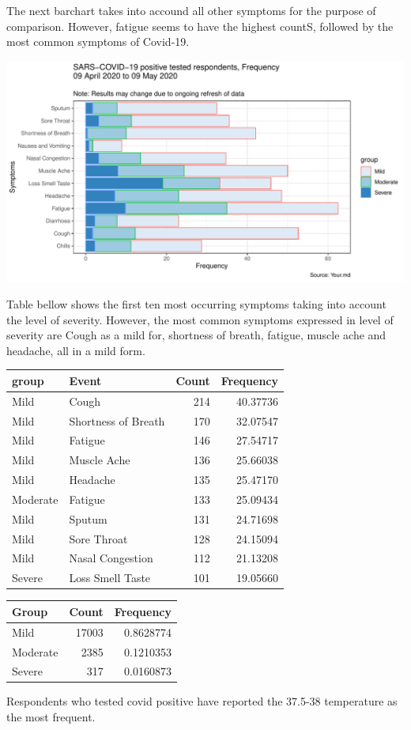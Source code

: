 \documentclass[
]{article}
\begin{document}
The next barchart takes into accound all other symptoms for the purpose
of comparison. However, fatigue seems to have the highest countS,
followed by the most common symptoms of Covid-19.

\includegraphics{Final_descript_analysis_files/figure-latex/symptom_profile_all_symptoms-1.pdf}

Table bellow shows the first ten most occurring symptoms taking into
account the level of severity. However, the most common symptoms
expressed in level of severity are Cough as a mild for, shortness of
breath, fatigue, muscle ache and headache, all in a mild form.

\begin{longtable}[]{@{}llrr@{}}
\toprule
group & Event & Count & Frequency\tabularnewline
\midrule
\endhead
Mild & Cough & 214 & 40.37736\tabularnewline
Mild & Shortness of Breath & 170 & 32.07547\tabularnewline
Mild & Fatigue & 146 & 27.54717\tabularnewline
Mild & Muscle Ache & 136 & 25.66038\tabularnewline
Mild & Headache & 135 & 25.47170\tabularnewline
Moderate & Fatigue & 133 & 25.09434\tabularnewline
Mild & Sputum & 131 & 24.71698\tabularnewline
Mild & Sore Throat & 128 & 24.15094\tabularnewline
Mild & Nasal Congestion & 112 & 21.13208\tabularnewline
Severe & Loss Smell Taste & 101 & 19.05660\tabularnewline
\bottomrule
\end{longtable}

\begin{longtable}[]{@{}lrr@{}}
\toprule
Group & Count & Frequency\tabularnewline
\midrule
\endhead
Mild & 17003 & 0.8628774\tabularnewline
Moderate & 2385 & 0.1210353\tabularnewline
Severe & 317 & 0.0160873\tabularnewline
\bottomrule
\end{longtable}

Respondents who tested covid positive have reported the 37.5-38
temperature as the most frequent.
\end{document}
